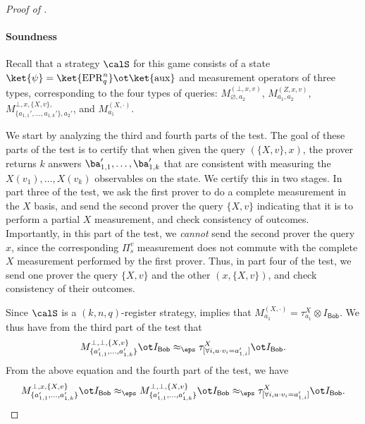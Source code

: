 \documentclass[11pt]{article}
\newcommand{\epr}{\mathrm{EPR}}
\newcommand{\rmaux}{\mathrm{aux}}
\newcommand{\reg}[1]{{\mathsf{#1}}}
\begin{document}
\begin{proof}[Proof of ]
  \paragraph{Soundness}
   Recall that a strategy $\calS$ for this game
  consists of a state $\ket{\psi} = \ket{\epr^n_q} \ot \ket{\rmaux}$ and measurement operators of three types, corresponding to
  the four types of queries: $M^{(\bot,
    x,v)}_{\varnothing, a_2}$, $M^{(Z, x, v)}_{a_1, a_2}$, $M^{\bot, x, \{X, v\}, }_{\{a_{1,1}',
    \dots, a_{1,k}'\}, a_2'}$, and $M^{(X, \cdot)}_{a_1}$. 

  We start by analyzing the third and fourth parts of the test. The goal of these
  parts of the test is to certify that when given the query $(\{X, v\}, x)$, the prover returns $k$ answers $\ba_{1,1}',
  \dots, \ba_{1,k}'$ that are consistent with measuring the $X(v_1),
  \dots, X(v_k)$ observables on the state. We certify this in two
  stages. In part three of the test, we ask
  the first prover to do a complete measurement in the $X$ basis, and send
  the second prover the query $\{X, v\}$ indicating that it is to
  perform a partial $X$ measurement, and
  check consistency of outcomes. Importantly, in this part of the
  test, we \emph{cannot} send the second prover the query $x$, since
  the corresponding $\Pi^v_s$ measurement does not commute with the
  complete $X$ measurement performed by the first prover. Thus, in
  part four of the test, we send one prover the query $\{X, v\}$ and
  the other $(x, \{X, v\})$, and check consistency of their
  outcomes. 
  
  Since $\calS$ is a
  $(k,n,q)$-register strategy,  implies that
  $M_{a_1}^{(X,\cdot)} = \tau^{X}_{a_1} \otimes I_{\reg{Bob}}$. We thus have
  from the third part of the test that
  \[ M^{\bot, \bot, \{X, v\}}_{\{a_{1,1}', \dots,
      a_{1,k}'\}} \ot I_{\reg{Bob}} \approx_\eps \tau^{X}_{[\forall i,
      u \cdot v_i = a'_{1,i}]} \ot I_{\reg{Bob}}.\]
  From the above equation and the fourth part of the test, we have
  \[ M^{\bot, x, \{X, v\}}_{\{a_{1,1}', \dots, a_{1,k}'\}} \ot
    I_{\reg{Bob}} \approx_\eps M^{\bot, \bot, \{X,v\}}_{\{a_{1,1}',
      \dots, a_{1,k}'\}} \ot I_{\reg{Bob}} \approx_\eps \tau^X_{[\forall i, u \cdot v_i =
      a'_{1,i}]} \ot I_{\reg{Bob}}. \]
  

\end{proof}
\end{document}
